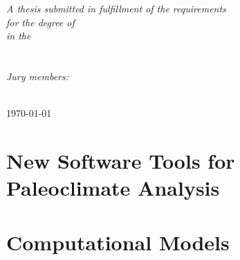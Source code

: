 \documentclass[
11pt, %
english, %
singlespacing, %
headsepline, %
]{MastersDoctoralThesis} %
\begin{document}
\begin{titlepage}
\begin{center}
\vfill

\large \textit{A thesis submitted in fulfillment of the requirements\\ for the degree of \degreename}\\[0.3cm] %
\textit{in the}\\[0.4cm]
\groupname\\\deptname\\[2cm] %

{\large \emph{Jury members:} \\
\examname}\\[2cm]

\vfill

{\large \today}\\[4cm] %

\vfill
\end{center}
\end{titlepage}




\tableofcontents %


\mainmatter %

\pagestyle{thesis} %




\part{New Software Tools for Paleoclimate Analysis}  \label{part:software}





\part{Computational Models}  \label{part:models}
\end{document}
